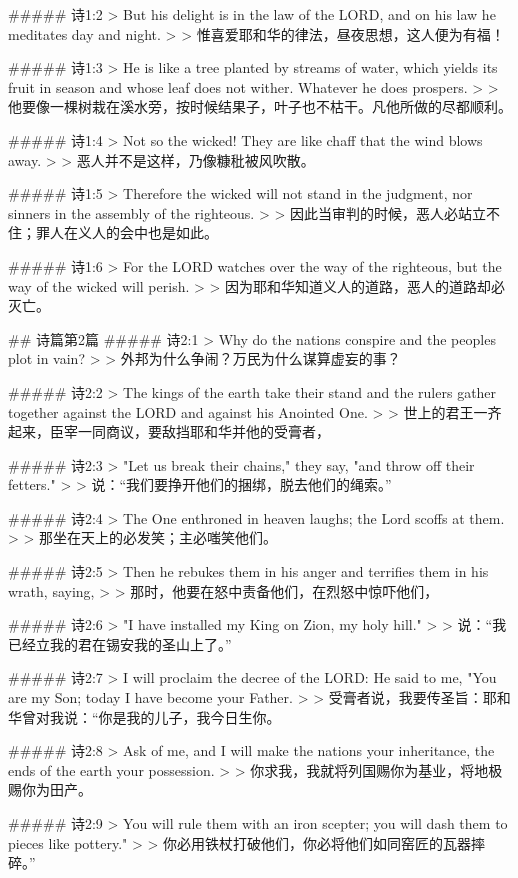 ##### 诗1:2
> But his delight is in the law of the LORD, and on his law he meditates day and night.
>
> 惟喜爱耶和华的律法，昼夜思想，这人便为有福！


##### 诗1:3
> He is like a tree planted by streams of water, which yields its fruit in season and whose leaf does not wither. Whatever he does prospers.
>
> 他要像一棵树栽在溪水旁，按时候结果子，叶子也不枯干。凡他所做的尽都顺利。


##### 诗1:4
> Not so the wicked! They are like chaff that the wind blows away.
>
> 恶人并不是这样，乃像糠秕被风吹散。


##### 诗1:5
> Therefore the wicked will not stand in the judgment, nor sinners in the assembly of the righteous.
>
> 因此当审判的时候，恶人必站立不住；罪人在义人的会中也是如此。


##### 诗1:6
> For the LORD watches over the way of the righteous, but the way of the wicked will perish.
>
> 因为耶和华知道义人的道路，恶人的道路却必灭亡。


## 诗篇第2篇
##### 诗2:1
> Why do the nations conspire and the peoples plot in vain?
>
> 外邦为什么争闹？万民为什么谋算虚妄的事？


##### 诗2:2
> The kings of the earth take their stand and the rulers gather together against the LORD and against his Anointed One.
>
> 世上的君王一齐起来，臣宰一同商议，要敌挡耶和华并他的受膏者，


##### 诗2:3
> "Let us break their chains," they say, "and throw off their fetters."
>
> 说：“我们要挣开他们的捆绑，脱去他们的绳索。”


##### 诗2:4
> The One enthroned in heaven laughs; the Lord scoffs at them.
>
> 那坐在天上的必发笑；主必嗤笑他们。


##### 诗2:5
> Then he rebukes them in his anger and terrifies them in his wrath, saying,
>
> 那时，他要在怒中责备他们，在烈怒中惊吓他们，


##### 诗2:6
> "I have installed my King on Zion, my holy hill."
>
> 说：“我已经立我的君在锡安我的圣山上了。”


##### 诗2:7
> I will proclaim the decree of the LORD: He said to me, "You are my Son; today I have become your Father.
>
> 受膏者说，我要传圣旨：耶和华曾对我说：“你是我的儿子，我今日生你。


##### 诗2:8
> Ask of me, and I will make the nations your inheritance, the ends of the earth your possession.
>
> 你求我，我就将列国赐你为基业，将地极赐你为田产。


##### 诗2:9
> You will rule them with an iron scepter; you will dash them to pieces like pottery."
>
> 你必用铁杖打破他们，你必将他们如同窑匠的瓦器摔碎。”


